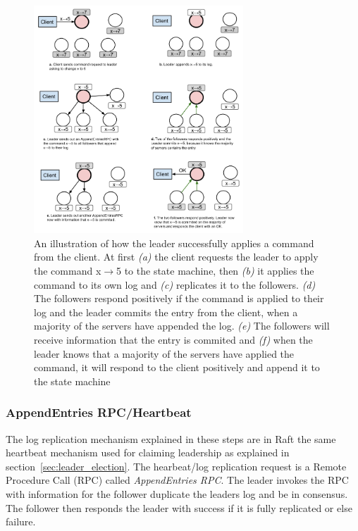 \begin{figure}[ht!]
  \centering
  \includegraphics[width=0.7\textwidth]{figures/log-replication-example.png}
  \caption{An illustration of how the leader successfully applies a command from the client. At first \emph{(a)} the client requests the leader to apply the command x$\rightarrow$5 to the state machine, then \emph{(b)} it applies the command to its own log and \emph{(c)} replicates it to the followers. \emph{(d)} The followers respond positively if the command is applied to their log and the leader commits the entry from the client, when a majority of the servers have appended the log. \emph{(e)} The followers will receive information that the entry is commited and \emph{(f)} when the leader knows that a majority of the servers have applied the command, it will respond to the client positively and append it to the state machine}
  \label{fig:log_replication_example}
\end{figure}

\subsubsection{AppendEntries RPC/Heartbeat} %
\label{ssub:appendentries_rpc_heartbeat}

The log replication mechanism explained in these steps are in Raft the same heartbeat mechanism used for claiming leadership as explained in section~\ref{sec:leader_election}. The hearbeat/log replication request is a Remote Procedure Call (RPC) called \emph{AppendEntries RPC}. The leader invokes the RPC with information for the follower duplicate the leaders log and be in consensus. The follower then responds the leader with success if it is fully replicated or else failure.

